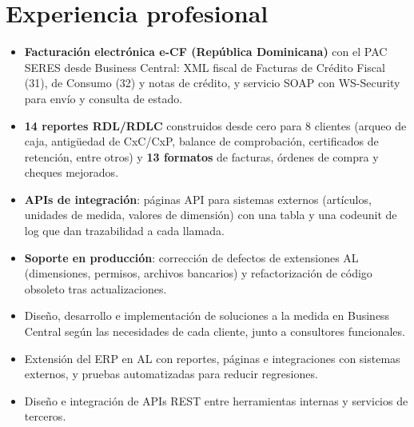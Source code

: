 \documentclass[10pt]{article}
\begin{document}
\section*{Experiencia profesional}
\begin{itemize}
  \item \textbf{Facturación electrónica e-CF (República Dominicana)} con el PAC SERES desde Business Central: XML fiscal de Facturas de Crédito Fiscal (31), de Consumo (32) y notas de crédito, y servicio SOAP con WS-Security para envío y consulta de estado.
  \item \textbf{14 reportes RDL/RDLC} construidos desde cero para 8 clientes (arqueo de caja, antigüedad de CxC/CxP, balance de comprobación, certificados de retención, entre otros) y \textbf{13 formatos} de facturas, órdenes de compra y cheques mejorados.
  \item \textbf{APIs de integración}: páginas API para sistemas externos (artículos, unidades de medida, valores de dimensión) con una tabla y una codeunit de log que dan trazabilidad a cada llamada.
  \item \textbf{Soporte en producción}: corrección de defectos de extensiones AL (dimensiones, permisos, archivos bancarios) y refactorización de código obsoleto tras actualizaciones.
\end{itemize}
\begin{itemize}
  \item Diseño, desarrollo e implementación de soluciones a la medida en Business Central según las necesidades de cada cliente, junto a consultores funcionales.
  \item Extensión del ERP en AL con reportes, páginas e integraciones con sistemas externos, y pruebas automatizadas para reducir regresiones.
\end{itemize}
\begin{itemize}
  \item Diseño e integración de APIs REST entre herramientas internas y servicios de terceros.
\end{itemize}
\end{document}
